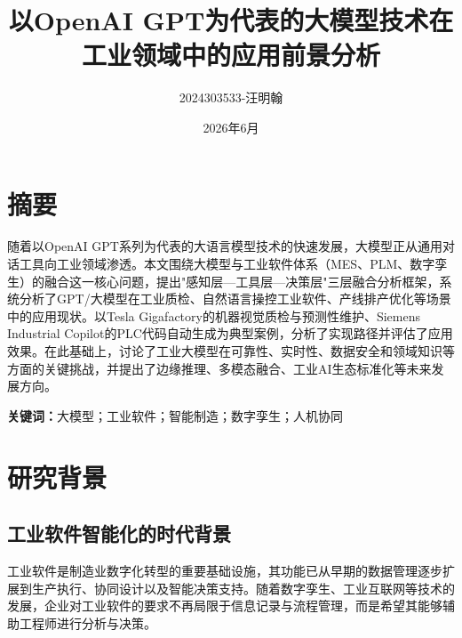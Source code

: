 \documentclass[12pt,a4paper]{ctexart}
\title{\textbf{以OpenAI GPT为代表的大模型技术在工业领域中的应用前景分析}}
\author{2024303533-汪明翰}          %
\date{2026年6月}
\begin{document}
\maketitle

\section*{摘要}


随着以OpenAI GPT系列为代表的大语言模型技术的快速发展，大模型正从通用对话工具向工业领域渗透。本文围绕大模型与工业软件体系（MES、PLM、数字孪生）的融合这一核心问题，提出"感知层—工具层—决策层"三层融合分析框架，系统分析了GPT/大模型在工业质检、自然语言操控工业软件、产线排产优化等场景中的应用现状。以Tesla Gigafactory的机器视觉质检与预测性维护、Siemens Industrial Copilot的PLC代码自动生成为典型案例，分析了实现路径并评估了应用效果。在此基础上，讨论了工业大模型在可靠性、实时性、数据安全和领域知识等方面的关键挑战，并提出了边缘推理、多模态融合、工业AI生态标准化等未来发展方向。

\noindent\textbf{关键词：}大模型；工业软件；智能制造；数字孪生；人机协同

\section{研究背景}

\subsection{工业软件智能化的时代背景}

工业软件是制造业数字化转型的重要基础设施，其功能已从早期的数据管理逐步扩展到生产执行、协同设计以及智能决策支持。随着数字孪生、工业互联网等技术的发展，企业对工业软件的要求不再局限于信息记录与流程管理，而是希望其能够辅助工程师进行分析与决策。
\end{document}
